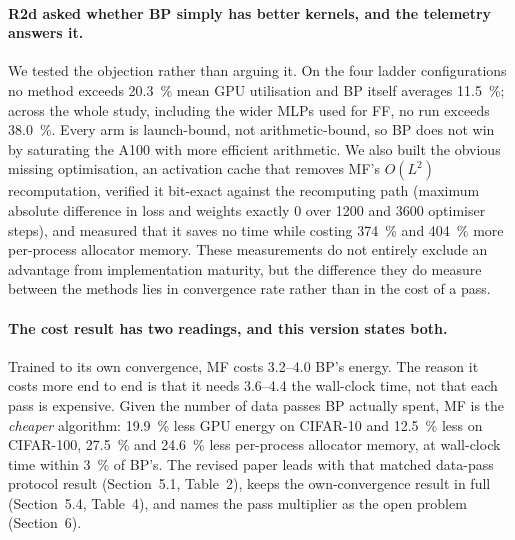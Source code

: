 \documentclass[11pt,a4paper]{article}
\newcommand{\FF}{FF}
\newcommand{\MF}{MF}
\newcommand{\BP}{BP}
\begin{document}
\paragraph{R2d asked whether \BP{} simply has better kernels, and the
telemetry answers it.}
We tested the objection rather than arguing it. On the four ladder
configurations no method exceeds \SI{20.3}{\percent} mean GPU utilisation and
\BP{} itself averages \SI{11.5}{\percent}; across the whole study, including
the wider MLPs used for \FF{}, no run exceeds
\SI{38.0}{\percent}. Every arm is launch-bound, not arithmetic-bound, so
\BP{} does not win by saturating the A100 with more efficient arithmetic. We also built
the obvious missing optimisation, an activation cache that removes \MF{}'s
$O(L^2)$ recomputation, verified it bit-exact against the recomputing path
(maximum absolute difference in loss and weights exactly \num{0} over
\num{1200} and \num{3600} optimiser steps), and measured that it saves no time
while costing \SI{374}{\percent} and \SI{404}{\percent} more per-process
allocator memory. These measurements do not entirely exclude an advantage
from implementation maturity, but the difference they do measure between the
methods lies in convergence rate rather than in the cost of a pass.

\paragraph{The cost result has two readings, and this version states both.}
Trained to its own convergence, \MF{} costs \SIrange{3.2}{4.0}{\times}
\BP{}'s energy. The reason it costs more end to end is that it needs
\SIrange{3.6}{4.4}{\times} the wall-clock time, not that each pass is
expensive. Given the number of data passes \BP{} actually spent, \MF{} is the
\emph{cheaper} algorithm: \SI{19.9}{\percent} less GPU energy on CIFAR-10 and
\SI{12.5}{\percent} less on CIFAR-100, \SI{27.5}{\percent} and
\SI{24.6}{\percent} less per-process allocator memory, at wall-clock time within
\SI{3}{\percent} of \BP{}'s. The revised paper leads with that
matched data-pass protocol result (Section~5.1, Table~2), keeps the
own-convergence result in full (Section~5.4, Table~4), and names the
pass multiplier as the open problem (Section~6).
\end{document}
